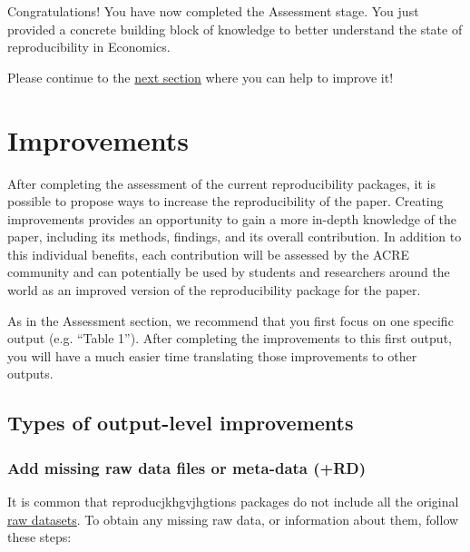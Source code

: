 \documentclass[]{book}
\begin{document}
Congratulations! You have now completed the Assessment stage. You just provided a concrete building block of knowledge to better understand the state of reproducibility in Economics.

Please continue to the \protect\hyperlink{improvements}{next section} where you can help to improve it!

\hypertarget{improvements}{%
\chapter{Improvements}\label{improvements}}

After completing the assessment of the current reproducibility packages, it is possible to propose ways to increase the reproducibility of the paper. Creating improvements provides an opportunity to gain a more in-depth knowledge of the paper, including its methods, findings, and its overall contribution. In addition to this individual benefits, each contribution will be assessed by the ACRE community and can potentially be used by students and researchers around the world as an improved version of the reproducibility package for the paper.

As in the Assessment section, we recommend that you first focus on one specific output (e.g. ``Table 1''). After completing the improvements to this first output, you will have a much easier time translating those improvements to other outputs.

\hypertarget{types-of-output-level-improvements}{%
\section{Types of output-level improvements}\label{types-of-output-level-improvements}}

\hypertarget{rd}{%
\subsection{Add missing raw data files or meta-data (+RD)}\label{rd}}

It is common that reproducjkhgvjhgtions packages do not include all the original \protect\hyperlink{describe-inputs}{raw datasets}. To obtain any missing raw data, or information about them, follow these steps:
\end{document}
